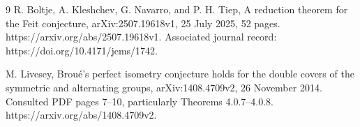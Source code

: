 \documentclass[10pt]{article}
\begin{document}
9 R. Boltje, A. Kleshchev, G. Navarro, and P. H. Tiep, A reduction theorem for the Feit conjecture, arXiv:2507.19618v1, 25 July 2025, 52 pages. https://arxiv.org/abs/2507.19618v1. Associated journal record: https://doi.org/10.4171/jems/1742.\par
M. Livesey, Broué’s perfect isometry conjecture holds for the double covers of the symmetric and alternating groups, arXiv:1408.4709v2, 26 November 2014. Consulted PDF pages 7–10, particularly Theorems 4.0.7–4.0.8. https://arxiv.org/abs/1408.4709v2.\par
\end{document}
